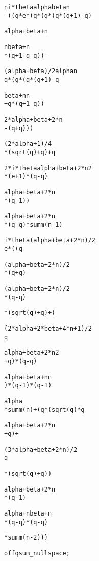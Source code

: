 {\footnotesize
\begin{alltt}

      n  i*theta   alpha   beta   n
 - ((q *e       *(q     *(q    *(q *(q + 1) - q)

                   alpha + beta + n


                      n    beta + n
           *(q + 1 - q  - q        )) -

         (alpha + beta)/2   alpha   n
        q                *(q     *(q *(q + 1) - q

                  beta + n           n
               + q        *(q + 1 - q ))

                2*alpha + beta + 2*n
            - (q                     + q)))

                       (2*alpha + 1)/4
     *(sqrt(q) + q) + q

        2*i*theta        alpha + beta + 2*n    2
     *(e          + 1)*(q                   - q )

        alpha + beta + 2*n
     *(q                   - 1))

       alpha + beta + 2*n
    *(q                   - q)*summ(n - 1) -

     i*theta    (alpha + beta + 2*n)/2
    e       *((q

                  (alpha + beta + 2*n)/2
               *(q                       + q)

                  (alpha + beta + 2*n)/2
               *(q                       - q)

               *(sqrt(q) + q) + (

                   (2*alpha + 2*beta + 4*n + 1)/2
                  q

                          alpha + beta + 2*n    2
                   + q)*(q                   - q )

                   alpha + beta + n        n
               )*(q                 - 1)*(q  - 1)

                           alpha
              *summ(n) + (q     *(sqrt(q)*q

                        alpha + beta + 2*n
                     + q                  ) +

                  (3*alpha + beta + 2*n)/2
                 q

                 *(sqrt(q) + q))

                 alpha + beta + 2*n
              *(q                   - 1)

                 alpha + n        beta + n
              *(q          - q)*(q         - q)

              *summ(n - 2)))

\redprompt off qsum_nullspace;
\end{alltt}}

